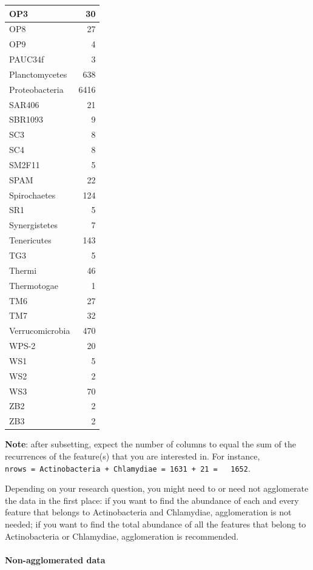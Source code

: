 \documentclass[
]{book}
\begin{document}
\begin{table}
{\begin{tabular}{l|r}
\hline
OP3 & 30\\
\hline
OP8 & 27\\
\hline
OP9 & 4\\
\hline
PAUC34f & 3\\
\hline
Planctomycetes & 638\\
\hline
Proteobacteria & 6416\\
\hline
SAR406 & 21\\
\hline
SBR1093 & 9\\
\hline
SC3 & 8\\
\hline
SC4 & 8\\
\hline
SM2F11 & 5\\
\hline
SPAM & 22\\
\hline
Spirochaetes & 124\\
\hline
SR1 & 5\\
\hline
Synergistetes & 7\\
\hline
Tenericutes & 143\\
\hline
TG3 & 5\\
\hline
Thermi & 46\\
\hline
Thermotogae & 1\\
\hline
TM6 & 27\\
\hline
TM7 & 32\\
\hline
Verrucomicrobia & 470\\
\hline
WPS-2 & 20\\
\hline
WS1 & 5\\
\hline
WS2 & 2\\
\hline
WS3 & 70\\
\hline
ZB2 & 2\\
\hline
ZB3 & 2\\
\hline
\end{tabular}}
\end{table}

\textbf{Note}: after subsetting, expect the number of columns to equal the
sum of the recurrences of the feature(s) that you are interested
in. For instance, \texttt{nrows\ =\ Actinobacteria\ +\ Chlamydiae\ =\ 1631\ +\ 21\ =\ \ \ 1652}.

Depending on your research question, you might need to or need not
agglomerate the data in the first place: if you want to find the
abundance of each and every feature that belongs to Actinobacteria and
Chlamydiae, agglomeration is not needed; if you want to find the total
abundance of all the features that belong to Actinobacteria or
Chlamydiae, agglomeration is recommended.

\hypertarget{non-agglomerated-data}{%
\paragraph{Non-agglomerated data}\label{non-agglomerated-data}}
\end{document}
